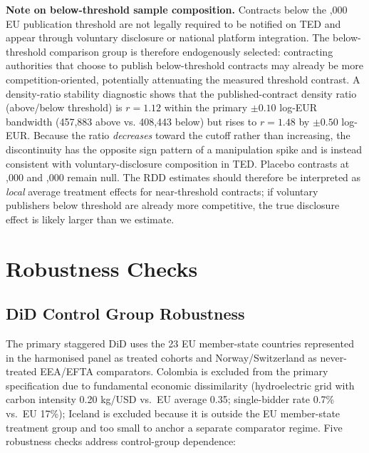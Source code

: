 \documentclass[11pt]{article}
\begin{document}
\textbf{Note on below-threshold sample composition.} Contracts below the ,000 EU publication threshold are not legally required to be notified on TED and appear through voluntary disclosure or national platform integration. The below-threshold comparison group is therefore endogenously selected: contracting authorities that choose to publish below-threshold contracts may already be more competition-oriented, potentially attenuating the measured threshold contrast. A density-ratio stability diagnostic shows that the published-contract density ratio (above/below threshold) is $r = 1.12$ within the primary $\pm 0.10$ log-EUR bandwidth (457,883 above vs. 408,443 below) but rises to $r = 1.48$ by $\pm 0.50$ log-EUR. Because the ratio \emph{decreases} toward the cutoff rather than increasing, the discontinuity has the opposite sign pattern of a manipulation spike and is instead consistent with voluntary-disclosure composition in TED. Placebo contrasts at ,000 and ,000 remain null. The RDD estimates should therefore be interpreted as \textit{local} average treatment effects for near-threshold contracts; if voluntary publishers below threshold are already more competitive, the true disclosure effect is likely larger than we estimate.

\section{Robustness Checks}
\label{sec:did_design}

\subsection{DiD Control Group Robustness}

The primary staggered DiD uses the 23 EU member-state countries represented in the harmonised panel as treated cohorts and Norway/Switzerland as never-treated EEA/EFTA comparators. Colombia is excluded from the primary specification due to fundamental economic dissimilarity (hydroelectric grid with carbon intensity 0.20 kg/USD vs.\ EU average 0.35; single-bidder rate 0.7\% vs.\ EU 17\%); Iceland is excluded because it is outside the EU member-state treatment group and too small to anchor a separate comparator regime. Five robustness checks address control-group dependence:
\end{document}
